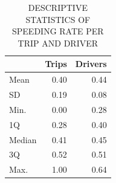 \begin{table}[!htbp]
    \footnotesize
    \captionsetup{justification=raggedright,
        singlelinecheck=false,
        font=footnotesize}
    \caption{DESCRIPTIVE STATISTICS OF SPEEDING RATE PER TRIP AND DRIVER}
    \centering
    \begin{tabular}{lrr}
        \hline
         & \multicolumn{1}{c}{\textbf{Trips}} & \multicolumn{1}{c}{\textbf{Drivers}} \\
        \hline
        Mean   &     0.40 & 0.44 \\
        SD     &     0.19 & 0.08 \\
        Min.   &     0.00 & 0.28 \\
        1Q     &     0.28 & 0.40 \\
        Median &     0.41 & 0.45 \\
        3Q     &     0.52 & 0.51 \\
        Max.   &     1.00 & 0.64 \\
        \hline
    \end{tabular}

\end{table}
